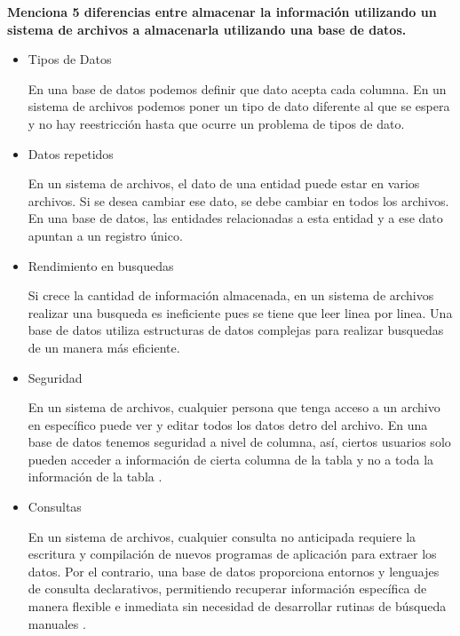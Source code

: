 \item \textbf{Menciona 5 diferencias entre almacenar la información utilizando un sistema de archivos a almacenarla utilizando una base de datos.}

\begin{itemize}
        \item Tipos de Datos

En una base de datos podemos definir que dato acepta cada columna. En un sistema de archivos podemos poner un tipo de dato diferente al que se espera y no hay reestricción hasta que ocurre un problema de tipos de dato.

        \item Datos repetidos

En un sistema de archivos, el dato de una entidad puede estar en varios archivos. Si se desea cambiar ese dato, se debe cambiar en todos los archivos. En una base de datos, las entidades relacionadas a esta entidad y a ese dato apuntan a un registro único.

        \item Rendimiento en busquedas

Si crece la cantidad de información almacenada, en un sistema de archivos realizar una busqueda es ineficiente pues se tiene que leer linea por linea. Una base de datos utiliza estructuras de datos complejas \parencite{silberschatz2006} para realizar busquedas de un manera más eficiente.

        \item Seguridad

En un sistema de archivos, cualquier persona que tenga acceso a un archivo en específico puede ver y editar todos los datos detro del archivo. En una base de datos tenemos seguridad a nivel de columna, así, ciertos usuarios solo pueden acceder a información de cierta columna de la tabla y no a toda la información de la tabla \parencite{microsoftcls2026}.

        \item Consultas

En un sistema de archivos, cualquier consulta no anticipada requiere la escritura y compilación de nuevos programas de aplicación para extraer los datos. Por el contrario, una base de datos proporciona entornos y lenguajes de consulta declarativos, permitiendo recuperar información específica de manera flexible e inmediata sin necesidad de desarrollar rutinas de búsqueda manuales \parencite{silberschatz2006}.
\end{itemize}
